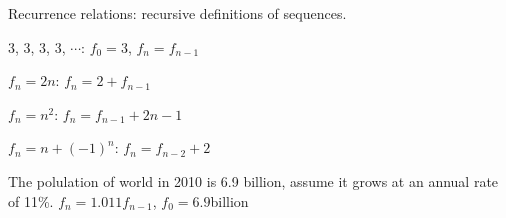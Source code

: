 \begin{remark}
Recurrence relations: recursive definitions of sequences.
\end{remark}

\begin{ex}
3, 3, 3, 3, $\cdots$: $f_0 = 3$, $f_n = f_{n - 1}$
\end{ex}

\begin{ex}
$f_n = 2n$: $f_n = 2 + f_{n - 1}$
\end{ex}

\begin{ex}
$f_n = n^2$: $f_n = f_{n - 1} + 2n - 1$
\end{ex}

\begin{ex}
$f_n = n + (-1)^n$: $f_n = f_{n - 2} + 2$
\end{ex}

\begin{ex}
The polulation of world in 2010 is 6.9 billion, assume it grows at an annual rate of 11\%.
$f_n = 1.011 f_{n - 1}$, $f_0 = 6.9$billion
\end{ex}

